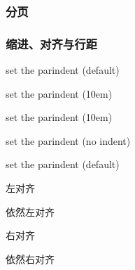 \documentclass{ctexart}
\begin{document}
        \subsubsection{分页}
            \newpage %
            \mbox{}
            \newpage
        
        \subsubsection{缩进、对齐与行距}
            set the parindent (default)
        
            {\setlength{\parindent}{10em} set the parindent (10em)

            set the parindent (10em)}

            \noindent set the parindent (no indent)

            set the parindent (default)

            \begin{flushleft}
                左对齐

                依然左对齐
            \end{flushleft}

            \begin{flushright}
                右对齐

                依然右对齐
            \end{flushright}
\end{document}
